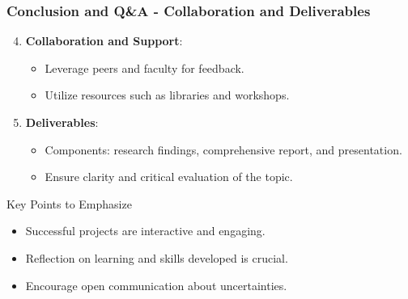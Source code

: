\documentclass[aspectratio=169]{beamer}
\begin{document}
\begin{frame}[fragile]
  \frametitle{Conclusion and Q\&A - Collaboration and Deliverables}

  \begin{enumerate}
    \setcounter{enumi}{3}  %
    \item \textbf{Collaboration and Support}:
      \begin{itemize}
        \item Leverage peers and faculty for feedback.
        \item Utilize resources such as libraries and workshops.
      \end{itemize}

    \item \textbf{Deliverables}:
      \begin{itemize}
        \item Components: research findings, comprehensive report, and presentation.
        \item Ensure clarity and critical evaluation of the topic.
      \end{itemize}
  \end{enumerate}

  \begin{block}{Key Points to Emphasize}
    \begin{itemize}
      \item Successful projects are interactive and engaging.
      \item Reflection on learning and skills developed is crucial.
      \item Encourage open communication about uncertainties.
    \end{itemize}
  \end{block}
\end{frame}
\end{document}
